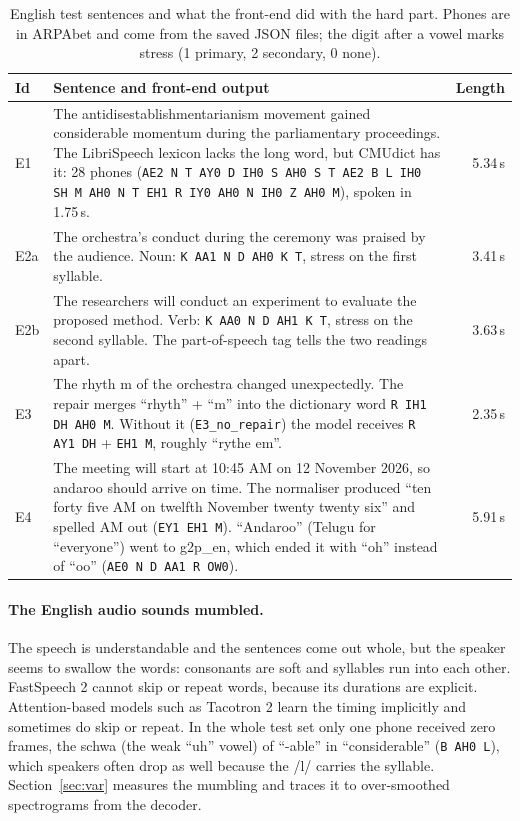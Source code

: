 \documentclass[11pt,a4paper]{article}
\newcommand{\code}[1]{\texttt{#1}}
\begin{document}
\begin{table}[H]\centering\small
\caption{English test sentences and what the front-end did with the hard part. Phones are in ARPAbet and come
from the saved JSON files; the digit after a vowel marks stress (1 primary, 2 secondary, 0 none).}
\label{tab:en-test}
\begin{tabularx}{\linewidth}{@{}l>{\raggedright\arraybackslash}Xr@{}}
\toprule
Id & Sentence and front-end output & Length \\
\midrule
E1 & The antidisestablishmentarianism movement gained considerable momentum during the parliamentary proceedings.
The LibriSpeech lexicon lacks the long word, but CMUdict has it: 28 phones
(\code{AE2 N T AY0 D IH0 S AH0 S T AE2 B L IH0 SH M AH0 N T EH1 R IY0 AH0 N IH0 Z AH0 M}), spoken in 1.75\,s. & 5.34\,s \\
E2a & The orchestra's conduct during the ceremony was praised by the audience. Noun: \code{K AA1 N D AH0 K T},
stress on the first syllable. & 3.41\,s \\
E2b & The researchers will conduct an experiment to evaluate the proposed method. Verb: \code{K AA0 N D AH1 K T},
stress on the second syllable. The part-of-speech tag tells the two readings apart. & 3.63\,s \\
E3 & The rhyth m of the orchestra changed unexpectedly. The repair merges ``rhyth'' + ``m'' into the dictionary
word \code{R IH1 DH AH0 M}. Without it (\code{E3\_no\_repair}) the model receives \code{R AY1 DH} + \code{EH1 M},
roughly ``rythe em''. & 2.35\,s \\
E4 & The meeting will start at 10:45 AM on 12 November 2026, so andaroo should arrive on time. The normaliser
produced ``ten forty five AM on twelfth November twenty twenty six'' and spelled AM out (\code{EY1 EH1 M}).
``Andaroo'' (Telugu for ``everyone'') went to g2p\_en, which ended it with ``oh'' instead of ``oo''
(\code{AE0 N D AA1 R OW0}). & 5.91\,s \\
\bottomrule
\end{tabularx}
\end{table}

\paragraph{The English audio sounds mumbled.} The speech is understandable and the sentences come out whole, but
the speaker seems to swallow the words: consonants are soft and syllables run into each other. FastSpeech 2 cannot
skip or repeat words, because its durations are explicit. Attention-based models such as Tacotron 2 learn the
timing implicitly and sometimes do skip or repeat. In the whole test set
only one phone received zero frames, the schwa (the weak ``uh'' vowel) of ``-able'' in ``considerable'' (\code{B AH0 L}), which speakers
often drop as well because the /l/ carries the syllable. Section~\ref{sec:var} measures the mumbling and traces it
to over-smoothed spectrograms from the decoder.
\end{document}
